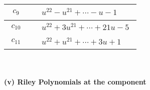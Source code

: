 \documentclass[1p]{elsarticle_modified}
\theoremstyle{definition}
\begin{document}
\begin{tabular}{m{50pt}|m{274pt}}
\hline $$\begin{aligned}c_{9}\end{aligned}$$&$\begin{aligned}
&u^{22}- u^{21}+\cdots- u-1
\end{aligned}$\\
\hline $$\begin{aligned}c_{10}\end{aligned}$$&$\begin{aligned}
&u^{22}+3 u^{21}+\cdots+21 u-5
\end{aligned}$\\
\hline $$\begin{aligned}c_{11}\end{aligned}$$&$\begin{aligned}
&u^{22}+u^{21}+\cdots+3 u+1
\end{aligned}$\\
\hline
\end{tabular}\\~\\
\newpage\renewcommand{\arraystretch}{1}
\flushleft \textbf{(v) Riley Polynomials at the component}\newline \\
\end{document}

